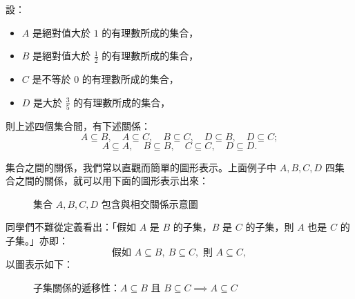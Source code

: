 \begin{enumerate}[(一)]
  \begin{example}\label{ex:2-3-3}
  設：
  \begin{itemize}
    \item $A$ 是絕對值大於 $1$ 的有理數所成的集合，
    \item $B$ 是絕對值大於 $\frac{1}{2}$ 的有理數所成的集合，
    \item $C$ 是不等於 $0$ 的有理數所成的集合，
    \item $D$ 是大於 $\frac{3}{5}$ 的有理數所成的集合，
  \end{itemize}
  則上述四個集合間，有下述關係：
  \begin{equation*}
    A \subseteq B, \quad A \subseteq C, \quad B \subseteq C, \quad D \subseteq B, \quad D \subseteq C;
  \end{equation*}
  \begin{equation*}
    A \subseteq A, \quad B \subseteq B, \quad C \subseteq C, \quad D \subseteq D.
  \end{equation*}
  \end{example}

  集合之間的關係，我們常以直觀而簡單的圖形表示。上面例子中 $A, B, C, D$ 四集合之間的關係，就可以用下面的圖形表示出來：

  \begin{figure}[htbp]
  \centering
  \caption{集合 $A, B, C, D$ 包含與相交關係示意圖}\label{fig:nested_subsets}
  \end{figure}

  同學們不難從定義看出：「假如 $A$ 是 $B$ 的子集，$B$ 是 $C$ 的子集，則 $A$ 也是 $C$ 的子集。」亦即：
  \begin{equation}\label{eq:transitive_subset}
    \text{假如 } A \subseteq B, \ B \subseteq C, \text{ 則 } A \subseteq C,
  \end{equation}
  以圖表示如下：

  \begin{figure}[htbp]
  \centering
  \caption{子集關係的遞移性：$A \subseteq B$ 且 $B \subseteq C \implies A \subseteq C$}\label{fig:transitive_subset}
  \end{figure}


\end{enumerate}
